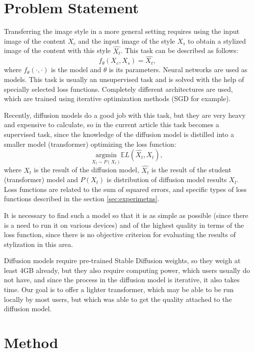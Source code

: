 \documentclass{article}
\begin{document}
\section{Problem Statement}
\label{sec:ps}
Transferring the image style in a more general setting requires using the input image of the content $X_{c}$ and the input image of the style $X_{s}$ to obtain a stylized image of the content with this style $\hat{X_{t}}$.
This task can be described as follows:
$$ f_{\theta}(X_{c},X_{s}) = \hat{X_{t}}, $$ where $f_{\theta}(\cdot, \cdot)$ is the model and $\theta$ is its parameters.
Neural networks are used as models. This task is usually an unsupervised task and is solved with the help of specially selected loss functions. Completely different architectures are used, which are trained using iterative optimization methods (SGD for example).

Recently, diffusion models do a good job with this task, but they are very heavy and expensive to calculate, so in the current article this task becomes a supervised task, since the knowledge of the diffusion model is distilled into a smaller model (transformer) optimizing the loss function:
$$ \underset{X_{t} \sim P(X_{t})}{\mathrm{argmin}}\mathbb{E}L(\hat{X_{t}}, X_{t}),$$
where $X_{t}$ is the result of the diffusion model, $\hat{X_{t}}$ is the result of the student (transformer) model and $P(X_{t})$ is distribution of diffusion model results $X_{t}$. Loss functions are related to the sum of squared errors, and specific types of loss functions described in the section \ref{sec:experimetns}.

It is necessary to find such a model so that it is as simple as possible (since there is a need to run it on various devices) and of the highest quality in terms of the loss function, since there is no objective criterion for evaluating the results of stylization in this area.

Diffusion models require pre-trained Stable Diffusion weights, so they weigh at least 4GB already, but they also require computing power, which users usually do not have, and since the process in the diffusion model is iterative, it also takes time. Our goal is to offer a lighter transformer, which may be able to be run locally by most users, but which was able to get the quality attached to the diffusion model.

\section{Method}
\label{sec:methods}
\end{document}
